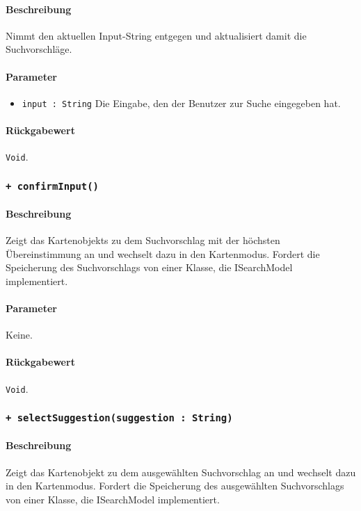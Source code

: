 \paragraph*{Beschreibung}
Nimmt den aktuellen Input-String entgegen und aktualisiert damit die Suchvorschläge.
\paragraph*{Parameter}
\begin{itemize}
    \item \texttt{input : String} Die Eingabe, den der Benutzer zur Suche eingegeben hat.
\end{itemize}
\paragraph*{Rückgabewert}
\texttt{Void}.

\subsubsection*{\texttt{+ confirmInput()}}\label{App_Search_ISearchController_confirmInput}%
\paragraph*{Beschreibung}
Zeigt das Kartenobjekts zu dem Suchvorschlag mit der höchsten Übereinstimmung an und wechselt dazu in den Kartenmodus.
Fordert die Speicherung des Suchvorschlags von einer Klasse, die ISearchModel implementiert.
\paragraph*{Parameter}
Keine.
\paragraph*{Rückgabewert}
\texttt{Void}.

\subsubsection*{\texttt{+ selectSuggestion(suggestion : String)}}\label{App_Search_ISearchController_selectSuggestion}%
\paragraph*{Beschreibung}
Zeigt das Kartenobjekt zu dem ausgewählten Suchvorschlag an und wechselt dazu in den Kartenmodus.
Fordert die Speicherung des ausgewählten Suchvorschlags von einer Klasse, die ISearchModel implementiert.
